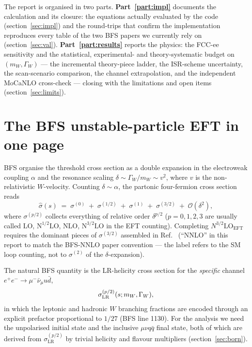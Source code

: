 \documentclass[11pt,a4paper]{article}
\newcommand{\mW}{m_W}
\newcommand{\GammaW}{\Gamma_W}
\newcommand{\munuqq}{\mu^-\bar\nu_\mu u\bar d}
\begin{document}
The report is organised in two parts. \textbf{Part~\ref{part:impl}}
documents the calculation and its closure: the equations actually
evaluated by the code (section~\ref{sec:impl}) and the round-trips that
confirm the implementation reproduces every table of the two BFS papers
we currently rely on (section~\ref{sec:val}). \textbf{Part~\ref{part:results}}
reports the physics: the FCC-ee sensitivity and the statistical,
experimental- and theory-systematic budget on $(\mW,\GammaW)$ --- the
incremental theory-piece ladder, the ISR-scheme uncertainty, the
scan-scenario comparison, the channel extrapolation, and the independent
MoCaNLO cross-check --- closing with the limitations and open items
(section~\ref{sec:limits}).

\section{The BFS unstable-particle EFT in one page}

BFS organise the threshold cross section as a double expansion in the
electroweak coupling $\alpha$ and the resonance scaling
$\delta\sim\GammaW/\mW \sim v^2$, where $v$ is the non-relativistic
$W$-velocity. Counting $\delta\sim\alpha$, the partonic four-fermion
cross section reads
\begin{equation}
\hat\sigma(s) \;=\; \sigma^{(0)} \;+\; \sigma^{(1/2)} \;+\; \sigma^{(1)}
   \;+\; \sigma^{(3/2)} \;+\; \mathcal{O}(\delta^2),
\label{eq:bfs-expansion}
\end{equation}
where $\sigma^{(p/2)}$ collects everything of relative order $\delta^{p/2}$
($p\!=\!0,1,2,3$ are usually called $\mathrm{LO}$, $\mathrm{N^{1/2}LO}$,
$\mathrm{NLO}$, $\mathrm{N^{3/2}LO}$ in the EFT counting). Completing
$N^{3/2}\text{LO}_\text{EFT}$ requires the dominant pieces of
$\sigma^{(3/2)}$ assembled in Ref.~\cite{BFSnnlo} (``NNLO'' in this
report to match the BFS-NNLO paper convention --- the label refers to
the SM loop counting, not to $\sigma^{(2)}$ of the $\delta$-expansion).

The natural BFS quantity is the LR-helicity cross section for the
\emph{specific} channel $e^+e^-\to\munuqq$,
\begin{equation}
\sigma_{\rm LR}^{(p/2)}(s;\mW,\GammaW),
\end{equation}
in which the leptonic and hadronic $W$ branching fractions are encoded
through an explicit prefactor proportional to $1/27$ (BFS line 1130).
For the analysis we need the unpolarised initial state and the inclusive
$\mu\nu q\bar q$ final state, both of which are derived from
$\sigma_\mathrm{LR}^{(p/2)}$ by trivial helicity and flavour multipliers
(section~\ref{sec:born}).
\end{document}
